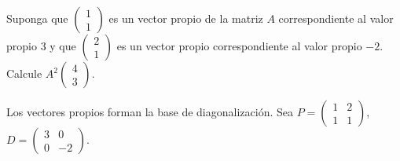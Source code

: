 \begin{prob}
Suponga que $\begin{pmatrix} 1 \\ 1 \end{pmatrix}$ es un vector propio de la matriz $A$ correspondiente al valor propio $3$ y que $\begin{pmatrix} 2 \\ 1 \end{pmatrix}$ es un vector propio correspondiente al valor propio $-2$. Calcule $A^{2}\begin{pmatrix} 4 \\ 3 \end{pmatrix}$.
\begin{myproof}
Los vectores propios forman la base de diagonalización. Sea $P = \begin{pmatrix} 1 & 2 \\ 1 & 1 \end{pmatrix}$, $D = \begin{pmatrix} 3 & 0 \\ 0 & -2 \end{pmatrix}$.


\end{myproof}
\end{prob}
